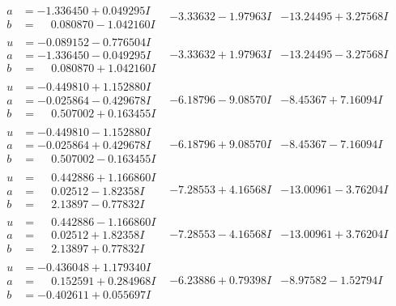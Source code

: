 \documentclass[1p]{elsarticle_modified}
\theoremstyle{definition}
\begin{document}
$$\begin{array}{c|c|c}
\begin{aligned}
a &= -1.336450 + 0.049295 I \\
b &= \phantom{-}0.080870 - 1.042160 I\end{aligned}
 & -3.33632 - 1.97963 I & -13.24495 + 3.27568 I \\ \hline\begin{aligned}
u &= -0.089152 - 0.776504 I \\
a &= -1.336450 - 0.049295 I \\
b &= \phantom{-}0.080870 + 1.042160 I\end{aligned}
 & -3.33632 + 1.97963 I & -13.24495 - 3.27568 I \\ \hline\begin{aligned}
u &= -0.449810 + 1.152880 I \\
a &= -0.025864 - 0.429678 I \\
b &= \phantom{-}0.507002 + 0.163455 I\end{aligned}
 & -6.18796 - 9.08570 I & -8.45367 + 7.16094 I \\ \hline\begin{aligned}
u &= -0.449810 - 1.152880 I \\
a &= -0.025864 + 0.429678 I \\
b &= \phantom{-}0.507002 - 0.163455 I\end{aligned}
 & -6.18796 + 9.08570 I & -8.45367 - 7.16094 I \\ \hline\begin{aligned}
u &= \phantom{-}0.442886 + 1.166860 I \\
a &= \phantom{-}0.02512 - 1.82358 I \\
b &= \phantom{-}2.13897 - 0.77832 I\end{aligned}
 & -7.28553 + 4.16568 I & -13.00961 - 3.76204 I \\ \hline\begin{aligned}
u &= \phantom{-}0.442886 - 1.166860 I \\
a &= \phantom{-}0.02512 + 1.82358 I \\
b &= \phantom{-}2.13897 + 0.77832 I\end{aligned}
 & -7.28553 - 4.16568 I & -13.00961 + 3.76204 I \\ \hline\begin{aligned}
u &= -0.436048 + 1.179340 I \\
a &= \phantom{-}0.152591 + 0.284968 I \\
b &= -0.402611 + 0.055697 I\end{aligned}
 & -6.23886 + 0.79398 I & -8.97582 - 1.52794 I \\ \hline\begin{aligned}

\end{aligned}
\end{array}$$
\end{document}
